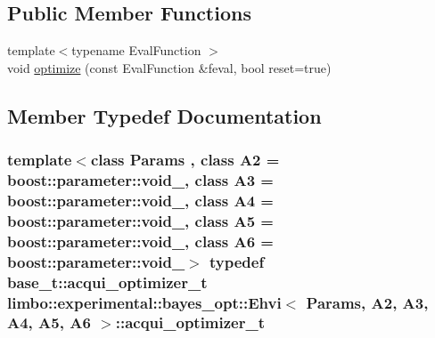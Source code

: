 \subsection*{Public Member Functions}
\begin{DoxyCompactItemize}
\item 
{\footnotesize template$<$typename Eval\+Function $>$ }\\void \hyperlink{classlimbo_1_1experimental_1_1bayes__opt_1_1_ehvi_a8b0bf0093f587c4e0b71612049bcec6e}{optimize} (const Eval\+Function \&feval, bool reset=true)
\end{DoxyCompactItemize}


\subsection{Member Typedef Documentation}
\hypertarget{classlimbo_1_1experimental_1_1bayes__opt_1_1_ehvi_a0bcaf7560c3d5cb4f18f2b6b3cbd521f}{}
\subsubsection[{acqui\+\_\+optimizer\+\_\+t}]{\setlength{\rightskip}{0pt plus 5cm}template$<$class Params , class A2  = boost\+::parameter\+::void\+\_\+, class A3  = boost\+::parameter\+::void\+\_\+, class A4  = boost\+::parameter\+::void\+\_\+, class A5  = boost\+::parameter\+::void\+\_\+, class A6  = boost\+::parameter\+::void\+\_\+$>$ typedef base\+\_\+t\+::acqui\+\_\+optimizer\+\_\+t {\bf limbo\+::experimental\+::bayes\+\_\+opt\+::\+Ehvi}$<$ Params, A2, A3, A4, A5, A6 $>$\+::{\bf acqui\+\_\+optimizer\+\_\+t}}\label{classlimbo_1_1experimental_1_1bayes__opt_1_1_ehvi_a0bcaf7560c3d5cb4f18f2b6b3cbd521f}
\hypertarget{classlimbo_1_1experimental_1_1bayes__opt_1_1_ehvi_aab1a707afba4fe47658755ca5b66a77e}{}
